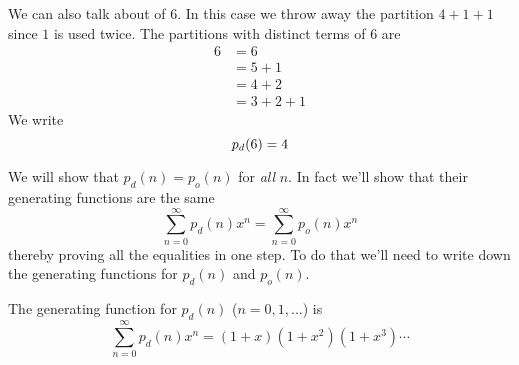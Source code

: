 We can also talk about  of $6$.
In this case we throw away the partition $4 + 1 + 1$ since $1$ is used twice.
The partitions with distinct terms of 6 are
\begin{align*}
6
&= 6 \\
&= 5 + 1\\
&= 4 + 2 \\
&= 3 + 2 + 1 
\end{align*}
We write
\[
p_d(6) = 4\index{pd@$p_d(n)$}
\]








\newpage
We will show that $p_d(n) = p_o(n)$ for \textit{all} $n$.
In fact we'll show that their generating functions are the same
\[
\sum_{n=0}^\infty p_d(n) x^n = 
\sum_{n=0}^\infty p_o(n) x^n 
\]
thereby proving all the equalities in one step.
To do that we'll need to write down the generating functions for $p_d(n)$
and $p_o(n)$.

The generating function for $p_d(n)$ ($n=0,1,...$) is
\[
\sum_{n=0}^\infty p_d(n) x^n
= (1 + x) (1 + x^2) (1 + x^3) \cdots
\]

